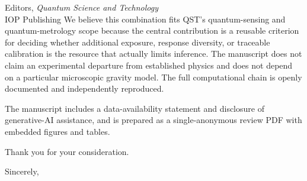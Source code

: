 \documentclass[10pt,a4paper]{letter}
\begin{document}
\begin{letter}{Editors, \textit{Quantum Science and Technology}\\IOP Publishing}
We believe this combination fits QST's quantum-sensing and quantum-metrology scope because the central contribution is a reusable criterion for deciding whether additional exposure, response diversity, or traceable calibration is the resource that actually limits inference. The manuscript does not claim an experimental departure from established physics and does not depend on a particular microscopic gravity model. The full computational chain is openly documented and independently reproduced.

The manuscript includes a data-availability statement and disclosure of generative-AI assistance, and is prepared as a single-anonymous review PDF with embedded figures and tables.

Thank you for your consideration.

\closing{Sincerely,}
\end{letter}
\end{document}
